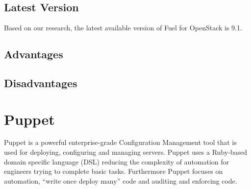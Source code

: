\documentclass[a4paper, 12pt]{article}
\begin{document}
\subsection{Latest Version}
Based on our research, the latest available version of Fuel for OpenStack is 9.1.
\subsection{Advantages}
\subsection{Disadvantages}

\newpage
\section{Puppet}
Puppet is a powerful enterprise-grade Configuration Management tool that is used for deploying, configuring and managing servers. Puppet uses a Ruby-based domain specific language (DSL) reducing the complexity of automation for engineers trying to complete basic tasks. Furthermore Puppet focuses on automation, “write once deploy many” code and auditing and enforcing code.
\end{document}
